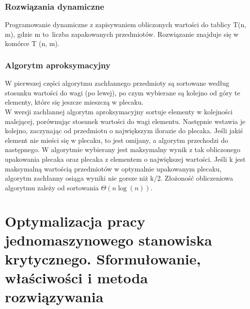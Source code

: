 \documentclass[10pt, a
4paper]{article}
\begin{document}
\subsubsection{Rozwiązania dynamiczne}
Programowanie dynamiczne z zapisywaniem obliczonych wartości do tablicy T(n, m), gdzie  m to~liczba zapakowanych przedmiotów. Rozwiązanie znajduje się w komórce T (n, m). 
\subsubsection{Algorytm aproksymacyjny}
W pierwszej części algorytmu zachłannego przedmioty są sortowane według stosunku wartości do wagi (po lewej), po czym wybierane są kolejno od góry te elementy, które się jeszcze mieszczą w plecaku.\\
\indent W wersji zachłannej algorytm aproksymacyjny sortuje elementy w kolejności malejącej, porównując stosunek wartości do wagi elementu. Następnie wstawia je kolejno, zaczynając od przedmiotu o największym ilorazie do plecaka. Jeśli jakiś element nie mieści się w plecaku, to jest omijany, a algorytm przechodzi do następnego. W algorytmie wybierany jest maksymalny wynik z tak obliczonego upakowania plecaka oraz plecaka z elementem o największej wartości. Jeśli k jest maksymalną wartością przedmiotów w optymalnie upakowanym plecaku, algorytm zachłanny osiąga wyniki nie gorsze niż k/2. Złożoność obliczeniowa algorytmu zależy od sortowania $\Theta(n\log(n))$.

\newpage
\section{Optymalizacja pracy jednomaszynowego stanowiska krytycznego. Sformułowanie,
właściwości i metoda rozwiązywania}
\end{document}
